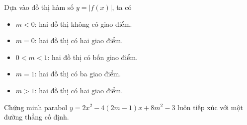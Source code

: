 \begin{bt}
{\begin{enumerate}
			Dựa vào đồ thị hàm số $y=|f(x)|$, ta có
			\begin{itemize}
				\item $m<0$: hai đồ thị không có giao điểm.
				\item $m=0$: hai đồ thị có hai giao điểm.
				\item $0<m<1$: hai đồ thị có bốn giao điểm.
				\item $m=1$: hai đồ thị có ba giao điểm.
				\item $m>1$: hai đồ thị có hai giao điểm.
			\end{itemize}
			\end{enumerate}
	}
\end{bt}

\begin{bt}%
	Chứng minh parabol $y=2x^2-4(2m-1)x+8m^2-3$ luôn tiếp xúc với một đường thẳng cố định.
\end{bt}

